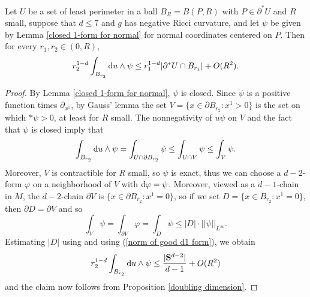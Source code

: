 \begin{lemma}\label{scalar curvature monotonicity}
Let $U$ be a set of least perimeter in a ball $B_R = B(P, R)$ with $P \in \partial^* U$ and $R$ small, suppose that $d \leq 7$ and $g$ has negative Ricci curvature, and let $\psi$ be given by Lemma \ref{closed 1-form for normal} for normal coordinates centered on $P$.
Then for every $r_1, r_2 \in (0, R)$,
$$r_2^{1 - d}\int_{B_{r_2}} \mathop{}\!\mathrm{d} u \wedge \psi \leq r_1^{1 - d}|\partial^*U \cap B_{r_1}| + O(R^2).$$
\end{lemma}
\begin{proof}
By Lemma \ref{closed 1-form for normal}, $\psi$ is closed.
Since $\psi$ is a positive function times $\partial_{x^1}$, by Gauss' lemma the set $V = \{x \in \partial B_{r_2}: x^1 > 0\}$ is the set on which $*\psi > 0$, at least for $R$ small.
The nonnegativity of $u\psi$ on $V$ and the fact that $\psi$ is closed imply that
$$\int_{B_{r_2}} \mathop{}\!\mathrm{d} u \wedge \psi = \int_{U \cap \partial B_{r_2}} \psi \leq \int_{U \cap V} \psi \leq \int_V \psi.$$
Moreover, $V$ is contractible for $R$ small, so $\psi$ is exact, thus we can choose a $d-2$-form $\varphi$ on a neighborhood of $V$ with $\mathop{}\!\mathrm{d} \varphi = \psi$.
Moreover, viewed as a $d-1$-chain in $M$, the $d-2$-chain $\partial V$ is $\{x \in \partial B_{r_2}: x^1 = 0\}$, so if we set $D = \{x \in B_{r_2}: x^1 = 0\}$, then $\partial D = \partial V$ and so
$$\int_V \psi = \int_{\partial V} \varphi = \int_D \psi \leq |D| \cdot ||\psi||_{L^\infty}.$$
Estimating $|D|$ using \cite{gray1974volume} and using (\ref{norm of good d1 form}), we obtain
$$r_2^{1 - d} \int_{B_{r_2}} \mathop{}\!\mathrm{d} u \wedge \psi \leq \frac{|\mathbf S^{d - 2}|}{d - 1} + O(R^2)$$
and the claim now follows from Proposition \ref{doubling dimension}.
\end{proof}

